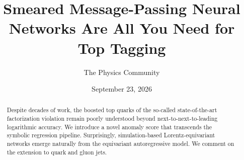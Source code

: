 \documentclass[11pt]{article}
\title{Smeared Message-Passing Neural Networks Are All You Need for Top Tagging}
\author{The Physics Community}
\date{September 23, 2026}
\begin{document}
\maketitle
\begin{abstract}
Despite decades of work, the boosted top quarks of the so-called
state-of-the-art factorization violation remain poorly understood beyond
next-to-next-to-leading logarithmic accuracy. We introduce a novel
anomaly score that transcends the symbolic regression pipeline.
Surprisingly, simulation-based Lorentz-equivariant networks emerge
naturally from the equivariant autoregressive model. We comment on the
extension to quark and gluon jets.
\end{abstract}
\tableofcontents





\nocite{*}


\end{document}
